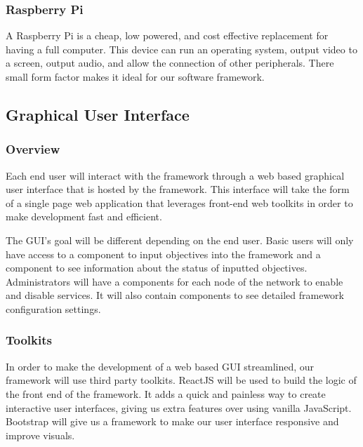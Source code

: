 \subsubsection{Raspberry Pi}
A Raspberry Pi is a cheap, low powered, and cost effective replacement for having a full computer. This device can run an operating system, output video to a screen, output audio, and allow the connection of other peripherals. There small form factor makes it ideal for our software framework.




\subsection{Graphical User Interface}
\subsubsection{Overview}
Each end user will interact with the framework through a web based graphical user interface that is hosted by the framework. This interface will take the form of a single page web application that leverages front-end web toolkits in order to make development fast and efficient.

The GUI's goal will be different depending on the end user. Basic users will only have access to a component to input objectives into the framework and a component to see information about the status of inputted objectives. Administrators will have a components for each node of the network to enable and disable services. It will also contain components to see detailed framework configuration settings.


\subsubsection{Toolkits}
In order to make the development of a web based GUI streamlined, our framework will use third party toolkits. ReactJS will be used to build the logic of the front end of the framework. It adds a quick and painless way to create interactive user interfaces, giving us extra features over using vanilla JavaScript. Bootstrap will give us a framework to make our user interface responsive and improve visuals.

